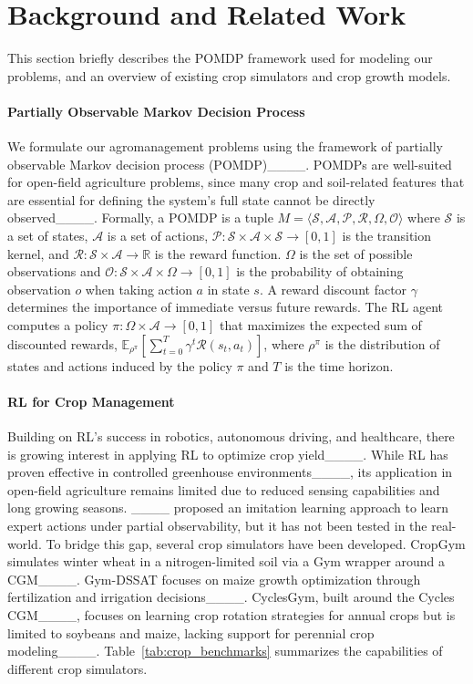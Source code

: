 \section{Background and Related Work}
\label{sec:related}

This section briefly describes the POMDP framework used for modeling our problems, and an overview of existing crop simulators and crop growth models. 
\paragraph{Partially Observable Markov Decision Process} We formulate our agromanagement problems using the framework of partially observable Markov decision process (POMDP)____.
POMDPs are well-suited for open-field agriculture problems, since many crop and soil-related features that are essential for defining the system's full state cannot be directly observed____. Formally, a POMDP is a tuple $M=\langle \mathcal{S}, \mathcal{A}, \mathcal{P}, \mathcal{R}, \Omega, \mathcal{O} \rangle$ where $\mathcal{S}$ is a set of states, $\mathcal{A}$ is a set of actions, $\mathcal{P}:\mathcal{S}\times \mathcal{A}\times\mathcal{S}\to[0,1]$ is the transition kernel, and $\mathcal{R}:\mathcal{S}\times\mathcal{A}\to\mathbb{R}$ is the reward function. $\Omega$ is the set of possible observations and $\mathcal{O}:\mathcal{S}\times\mathcal{A}\times\Omega\to[0,1]$ is the probability of obtaining observation $o$ when taking action $a$ in state $s$. A reward discount factor $\gamma$ determines the importance of immediate versus future rewards. The RL agent computes a policy $\pi:\Omega\times \mathcal{A}\to[0,1]$ that maximizes the expected sum of discounted rewards, $\mathbb{E}_{\rho^\pi}\left[\sum_{t=0}^T\gamma^t\mathcal{R}(s_t,a_t)\right]$, where $\rho^\pi$ is the distribution of states and actions induced by the policy $\pi$ and $T$ is the time horizon. 

\paragraph{RL for Crop Management}
Building on RL's success in robotics, autonomous driving, and healthcare, there is growing interest in applying RL to optimize crop yield____. While RL has proven effective in controlled greenhouse environments____, its application in open-field agriculture remains limited due to reduced sensing capabilities and long growing seasons. ____ proposed an imitation learning approach to learn expert actions under partial observability, but it has not been tested in the real-world. To bridge this gap, several crop simulators have been developed. CropGym simulates winter wheat in a nitrogen-limited soil via a Gym wrapper around a CGM____. Gym-DSSAT focuses on maize growth optimization through fertilization and irrigation decisions____. CyclesGym, built around the Cycles CGM____, focuses on learning crop rotation strategies for annual crops but is limited to soybeans and maize, lacking support for perennial crop modeling____. Table~\ref{tab:crop_benchmarks} summarizes the capabilities of different crop simulators.

